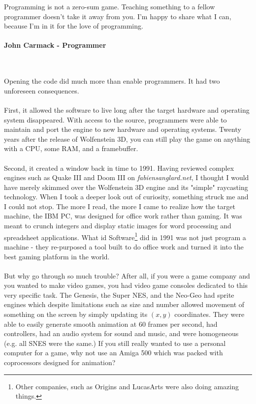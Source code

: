  \begin{fancyquotes}
   Programming is not a zero-sum game. Teaching something to a fellow programmer doesn't take it away from you. I'm happy to share what I can, because I'm in it for the love of programming.\\
   \\
\textbf{John Carmack - Programmer}
 \end{fancyquotes}\\
\\
Opening the code did much more than enable programmers. It had two unforeseen consequences.\\
\\
First, it allowed the software to live long after the target hardware and operating system disappeared. With access to the source, programmers were able to maintain and port the engine to new hardware and operating systems. Twenty years after the release of Wolfenstein 3D, you can still play the game on anything with a CPU, some RAM, and a framebuffer. \\
\\
Second, it created a window back in time to 1991. Having reviewed complex engines such as Quake III and Doom III on \emph{fabiensanglard.net}, I thought I would have merely skimmed over the Wolfenstein 3D engine and its "simple" raycasting technology. When I took a deeper look out of curiosity, something struck me and I could not stop. The more I read, the more I came to realize how the target machine, the IBM PC, was designed for office work rather than gaming. It was meant to crunch integers and display static images for word processing and spreadsheet applications. 
What id Software\footnote{Other companies, such as Origins and LucasArts were also doing amazing things.} did in 1991 was not just program a machine - they re-purposed a tool built to do office work and turned it into the best gaming platform in the world.\\
\\
But why go through so much trouble? After all, if you were a game company and you wanted to make video games, you had video game consoles dedicated to this very specific task. The Genesis, the Super NES, and the Neo-Geo had sprite engines\label{sprite_engine_ref} which despite limitations such as size and number allowed movement of something on the screen by simply updating its $(x,y)$ coordinates. They were able to easily generate smooth animation at 60 frames per second, had controllers, had an audio system for sound and music, and were homogeneous (e.g. all SNES were the same.) If you still really wanted to use a personal computer for a game, why not use an Amiga 500 which was packed with coprocessors designed for animation?\\
